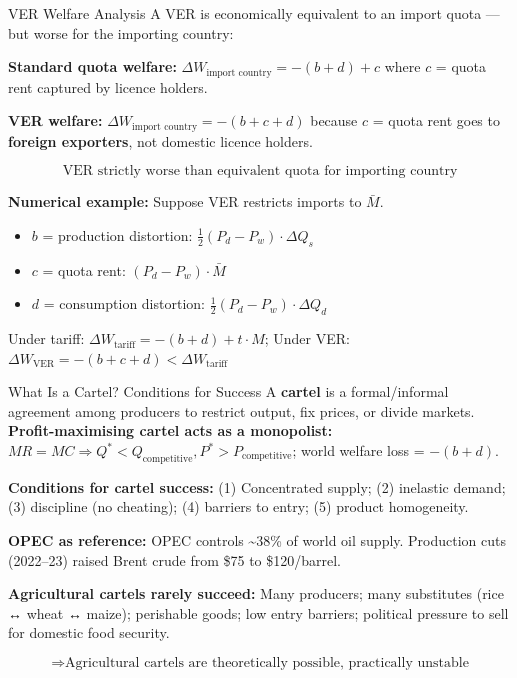 \documentclass[
  ignorenonframetext,
  aspectratio=169,
]{beamer}
\makeatletter
\providecommand{\tightlist}{%
  \setlength{\itemsep}{0pt}\setlength{\parskip}{0pt}}
\let\quarto@originallabel\label
\DeclareRobustCommand*{\label}[1]{\quarto@originallabel{#1}}
\makeatother
\begin{document}
\begin{frame}{VER Welfare Analysis}
\label{ver-welfare-analysis}
A VER is economically equivalent to an import quota --- but worse for
the importing country:

\textbf{Standard quota welfare:}
\(\Delta W_{\text{import country}} = -(b + d) + c\) where \(c\) = quota
rent captured by licence holders.

\textbf{VER welfare:}
\(\Delta W_{\text{import country}} = -(b + c + d)\) because \(c\) =
quota rent goes to \textbf{foreign exporters}, not domestic licence
holders.

\[\boxed{\text{VER strictly worse than equivalent quota for importing country}}\]

\textbf{Numerical example:} Suppose VER restricts imports to
\(\bar{M}\).

\begin{itemize}
\tightlist
\item
  \(b\) = production distortion:
  \(\frac{1}{2}(P_d - P_w) \cdot \Delta Q_s\)
\item
  \(c\) = quota rent: \((P_d - P_w) \cdot \bar{M}\)
\item
  \(d\) = consumption distortion:
  \(\frac{1}{2}(P_d - P_w) \cdot \Delta Q_d\)
\end{itemize}

Under tariff: \(\Delta W_{\text{tariff}} = -(b+d) + t \cdot M\); Under
VER: \(\Delta W_{\text{VER}} = -(b+c+d) < \Delta W_{\text{tariff}}\)
\end{frame}

\begin{frame}{What Is a Cartel? Conditions for Success}
\label{what-is-a-cartel-conditions-for-success}
A \textbf{cartel} is a formal/informal agreement among producers to
restrict output, fix prices, or divide markets.
\textbf{Profit-maximising cartel acts as a monopolist:}
\(MR = MC \Rightarrow Q^* < Q_{\text{competitive}}, P^* > P_{\text{competitive}}\);
world welfare loss = \(-(b + d)\).

\textbf{Conditions for cartel success:} (1) Concentrated supply; (2)
inelastic demand; (3) discipline (no cheating); (4) barriers to entry;
(5) product homogeneity.

\textbf{OPEC as reference:} OPEC controls \textasciitilde38\% of world
oil supply. Production cuts (2022--23) raised Brent crude from \$75 to
\$120/barrel.

\textbf{Agricultural cartels rarely succeed:} Many producers; many
substitutes (rice ↔ wheat ↔ maize); perishable goods; low entry
barriers; political pressure to sell for domestic food security.

\[\Rightarrow \text{Agricultural cartels are theoretically possible, practically unstable}\]
\end{frame}
\end{document}
